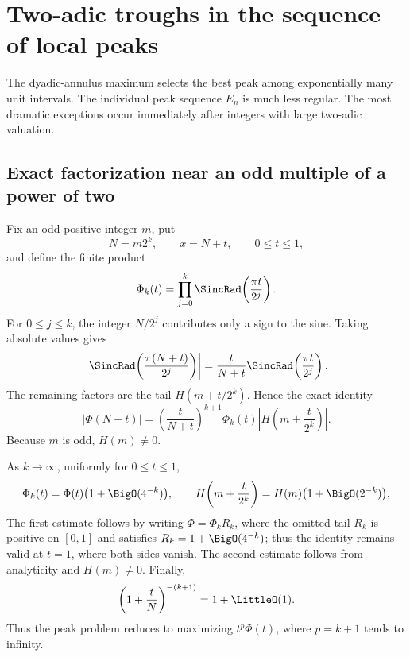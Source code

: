 \documentclass[11pt,oneside]{article}
\theoremstyle{definition}
\theoremstyle{remark}
\newcommand{\PhiF}{\Phi}
\begin{document}
\section{Two-adic troughs in the sequence of local peaks}
\label{sec:two-adic-troughs}

The dyadic-annulus maximum selects the best peak among exponentially many
unit intervals.  The individual peak sequence \(E_n\) is much less regular.
The most dramatic exceptions occur immediately after integers with large
two-adic valuation.

\subsection{Exact factorization near an odd multiple of a power of two}

Fix an odd positive integer \(m\), put
\[
 N=m2^k,
 \qquad x=N+t,
 \qquad 0\le t\le1,
\]
and define the finite product
\begin{equation}
 \PhiF_k(t)=\prod_{j=0}^{k}
 \SincRad\!\left(\frac{\pi t}{2^j}\right).
 \label{eq:Phi-k-finite}
\end{equation}
For \(0\le j\le k\), the integer \(N/2^j\) contributes only a sign to the
sine.  Taking absolute values gives
\[
 \left|
 \SincRad\!\left(\frac{\pi(N+t)}{2^j}\right)
 \right|
 =\frac{t}{N+t}
 \SincRad\!\left(\frac{\pi t}{2^j}\right).
\]
The remaining factors are the tail \(H(m+t/2^k)\).  Hence the exact identity
\begin{equation}
 |\PhiF(N+t)|
 =\left(\frac{t}{N+t}\right)^{k+1}
 \PhiF_k(t)
 \left|H\!\left(m+\frac{t}{2^k}\right)\right|.
 \label{eq:near-m2k-factorization}
\end{equation}
Because \(m\) is odd, \(H(m)\ne0\).

As \(k\to\infty\), uniformly for \(0\le t\le1\),
\begin{equation}
 \PhiF_k(t)=\PhiF(t)\bigl(1+\BigO(4^{-k})\bigr),
 \qquad
 H\!\left(m+\frac{t}{2^k}\right)
 =H(m)\bigl(1+\BigO(2^{-k})\bigr),
 \label{eq:uniform-tail-approximations}
\end{equation}
The first estimate follows by writing \(\PhiF=\PhiF_k R_k\), where the
omitted tail \(R_k\) is positive on \([0,1]\) and satisfies
\(R_k=1+\BigO(4^{-k})\); thus the identity remains valid at \(t=1\), where
both sides vanish.  The second estimate follows from analyticity and
\(H(m)\ne0\).  Finally,
\begin{equation}
 \left(1+\frac{t}{N}\right)^{-(k+1)}=1+\LittleO(1).
 \label{eq:N-denominator-uniform}
\end{equation}
Thus the peak problem reduces to maximizing \(t^p\PhiF(t)\), where
\(p=k+1\) tends to infinity.
\end{document}
